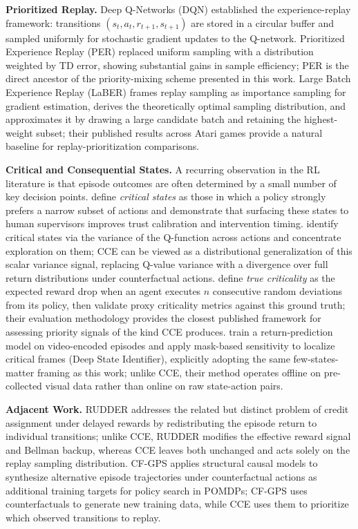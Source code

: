\documentclass[conference]{IEEEtran}
\begin{document}
\noindent\textbf{Prioritized Replay.}
Deep Q-Networks (DQN) \cite{mnih2013playingatarideepreinforcement} established the experience-replay framework: transitions $(s_t, a_t, r_{t+1}, s_{t+1})$ are stored in a circular buffer and sampled uniformly for stochastic gradient updates to the Q-network.
Prioritized Experience Replay (PER) \cite{schaul2016prioritizedexperiencereplay} replaced uniform sampling with a distribution weighted by TD error, showing substantial gains in sample efficiency; PER is the direct ancestor of the priority-mixing scheme presented in this work.
Large Batch Experience Replay (LaBER) \cite{lahire2022largebatch} frames replay sampling as importance sampling for gradient estimation, derives the theoretically optimal sampling distribution, and approximates it by drawing a large candidate batch and retaining the highest-weight subset; their published results across Atari games provide a natural baseline for replay-prioritization comparisons.

\noindent\textbf{Critical and Consequential States.}
A recurring observation in the RL literature is that episode outcomes are often determined by a small number of key decision points.
\cite{huang2018establishing} define \emph{critical states} as those in which a policy strongly prefers a narrow subset of actions and demonstrate that surfacing these states to human supervisors improves trust calibration and intervention timing.
\cite{karino2020identifying} identify critical states via the variance of the Q-function across actions and concentrate exploration on them; CCE can be viewed as a distributional generalization of this scalar variance signal, replacing Q-value variance with a divergence over full return distributions under counterfactual actions.
\cite{grushin2024criticality} define \emph{true criticality} as the expected reward drop when an agent executes $n$ consecutive random deviations from its policy, then validate proxy criticality metrics against this ground truth; their evaluation methodology provides the closest published framework for assessing priority signals of the kind CCE produces.
\cite{liu2023learning} train a return-prediction model on video-encoded episodes and apply mask-based sensitivity to localize critical frames (Deep State Identifier), explicitly adopting the same few-states-matter framing as this work; unlike CCE, their method operates offline on pre-collected visual data rather than online on raw state-action pairs.

\noindent\textbf{Adjacent Work.}
RUDDER \cite{arjona2019rudder} addresses the related but distinct problem of credit assignment under delayed rewards by redistributing the episode return to individual transitions; unlike CCE, RUDDER modifies the effective reward signal and Bellman backup, whereas CCE leaves both unchanged and acts solely on the replay sampling distribution.
CF-GPS \cite{buesing2019woulda} applies structural causal models to synthesize alternative episode trajectories under counterfactual actions as additional training targets for policy search in POMDPs; CF-GPS uses counterfactuals to generate new training data, while CCE uses them to prioritize which observed transitions to replay.
\end{document}
